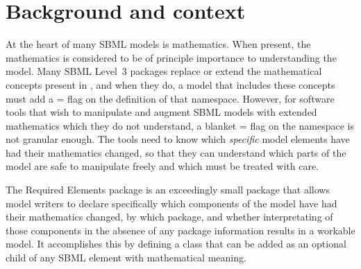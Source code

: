 
\section{Background and context}
\label{background}

At the heart of many SBML models is mathematics. When present, the mathematics is considered to be of principle importance to understanding the model. Many SBML Level~3 packages replace or extend the mathematical concepts present in \sbmlthreecore, and when they do, a model that includes these concepts must add a = flag on the definition of that namespace.  However, for software tools that wish to manipulate and augment SBML models with extended mathematics which they do not understand, a blanket = flag on the namespace is not granular enough.  The tools need to know which \emph{specific} model elements have had their mathematics changed, so that they can understand which parts of the model are safe to manipulate freely and which must be treated with care.

The Required Elements package is an exceedingly small package that allows model writers to declare specifically which components of the model have had their mathematics changed, by which package, and whether interpretating of those components in the absence of any package information results in a workable model.  It accomplishes this by defining a class that can be added as an optional child of any SBML element with mathematical meaning.
